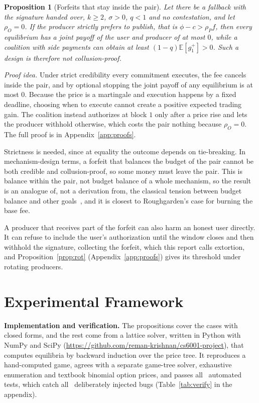 \documentclass[11pt]{article}
\newtheorem{proposition}{Proposition}
\newcommand{\E}{\mathbb{E}}
\newcommand{\repo}{\url{https://github.com/reman-krishnan/cs6001-project}}
\begin{document}
\begin{proposition}[Forfeits that stay inside the pair]\label{prop:imposs}
Let there be a fallback with the signature handed over, $k\ge2$, $\sigma>0$, $q<1$ and no contestation, and let $\rho_O=0$. If the producer strictly prefers to publish, that is $\phi-c>\rho_P f$, then every equilibrium has a joint payoff of the user and producer of at most $0$, while a coalition with side payments can obtain at least $(1-q)\E[g_1^+]>0$. Such a design is therefore not collusion-proof.
\end{proposition}
\emph{Proof idea.} Under strict credibility every commitment executes, the fee cancels inside the pair, and by optional stopping the joint payoff of any equilibrium is at most $0$. Because the price is a martingale and execution happens by a fixed deadline, choosing when to execute cannot create a positive expected trading gain. The coalition instead authorizes at block $1$ only after a price rise and lets the producer withhold otherwise, which costs the pair nothing because $\rho_O=0$. The full proof is in Appendix~\ref{app:proofs}.


Strictness is needed, since at equality the outcome depends on tie-breaking. In mechanism-design terms, a forfeit that balances the budget of the pair cannot be both credible and collusion-proof, so some money must leave the pair. This is balance within the pair, not budget balance of a whole mechanism, so the result is an analogue of, not a derivation from, the classical tension between budget balance and other goals~\cite{greenlaffont1977,nath2019budget}, and it is closest to Roughgarden's case for burning the base fee.

A producer that receives part of the forfeit can also harm an honest user directly. It can refuse to include the user's authorization until the window closes and then withhold the signature, collecting the forfeit, which this report calls extortion, and Proposition~\ref{prop:rot} (Appendix~\ref{app:proofs}) gives its threshold under rotating producers.




\section{Experimental Framework}\label{sec:framework}
\textbf{Implementation and verification.} The propositions cover the cases with closed forms, and the rest come from a lattice solver, written in Python with NumPy and SciPy (\repo), that computes equilibria by backward induction over the price tree. It reproduces a hand-computed game, agrees with a separate game-tree solver, exhaustive enumeration and textbook binomial option prices, and passes all \NTests\ automated tests, which catch all \NMutants\ deliberately injected bugs (Table~\ref{tab:verify} in the appendix).
\end{document}

